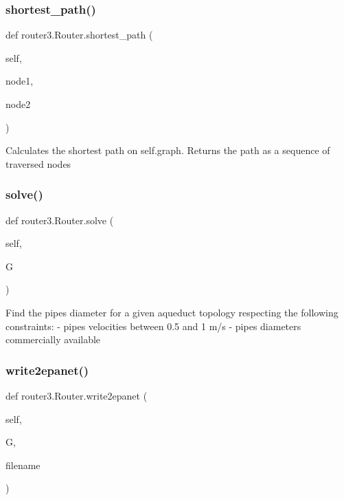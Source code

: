 \subsubsection{shortest\+\_\+path()}
{\footnotesize\ttfamily def router3.\+Router.\+shortest\+\_\+path (\begin{DoxyParamCaption}\item[{}]{self,  }\item[{}]{node1,  }\item[{}]{node2 }\end{DoxyParamCaption})}

\begin{DoxyVerb}Calculates the shortest path on self.graph.
Returns the path as a sequence of traversed nodes
\end{DoxyVerb}
 \mbox{\label{classrouter3_1_1_router_afbed1a1bb0576d1b5c2ba46ebb5db514}} 
\subsubsection{solve()}
{\footnotesize\ttfamily def router3.\+Router.\+solve (\begin{DoxyParamCaption}\item[{}]{self,  }\item[{}]{G }\end{DoxyParamCaption})}

\begin{DoxyVerb}Find the pipes diameter for a given aqueduct topology respecting the following constraints:
    - pipes velocities between 0.5 and 1 m/s
    - pipes diameters commercially available
\end{DoxyVerb}
 \mbox{\label{classrouter3_1_1_router_a41d6b0857c06debb02ceff527dc6b639}} 
\subsubsection{write2epanet()}
{\footnotesize\ttfamily def router3.\+Router.\+write2epanet (\begin{DoxyParamCaption}\item[{}]{self,  }\item[{}]{G,  }\item[{}]{filename }\end{DoxyParamCaption})}

